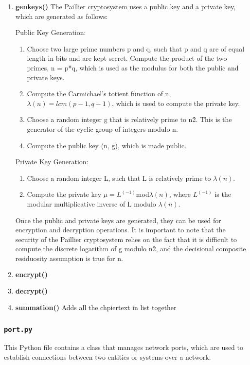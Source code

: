 \documentclass{article}
\begin{document}
\begin{enumerate}
    \item \textbf{genkeys()} The Paillier cryptosystem uses a public key and a private key, which are generated as follows:

          Public Key Generation:
          \begin{enumerate}
              \item Choose two large prime numbers p and q, such that p and q are of equal length in bits and are kept secret.
                    Compute the product of the two primes, n = p*q, which is used as the modulus for both the public and private keys.
              \item Compute the Carmichael's totient function of n, $\lambda(n) = lcm(p-1, q-1)$, which is used to compute the private key.
              \item Choose a random integer g that is relatively prime to n\^2. This is the generator of the cyclic group of integers modulo n.
              \item Compute the public key (n, g), which is made public.
          \end{enumerate}
          Private Key Generation:
          \begin{enumerate}
              \item Choose a random integer L, such that L is relatively prime to $\lambda(n)$.
              \item Compute the private key $\mu = L^{(-1)} $mod$ \lambda(n)$, where $L^{(-1)}$ is the modular multiplicative inverse of L modulo $\lambda(n)$.
          \end{enumerate}
          Once the public and private keys are generated, they can be used for encryption and decryption operations.
          It is important to note that the security of the Paillier cryptosystem relies on the fact that it is difficult to compute the discrete logarithm of g modulo n\^2, and the decisional composite residuosity assumption is true for n.

    \item  \textbf{encrypt()}
    \item  \textbf{decrypt()}

    \item  \textbf{summation()}
          Adds all the chpiertext in list together
\end{enumerate}

\subsubsection{\texttt{port.py}} This Python file contains a class that manages network ports, which are used to establish connections between two entities or systems over a network.
\end{document}
